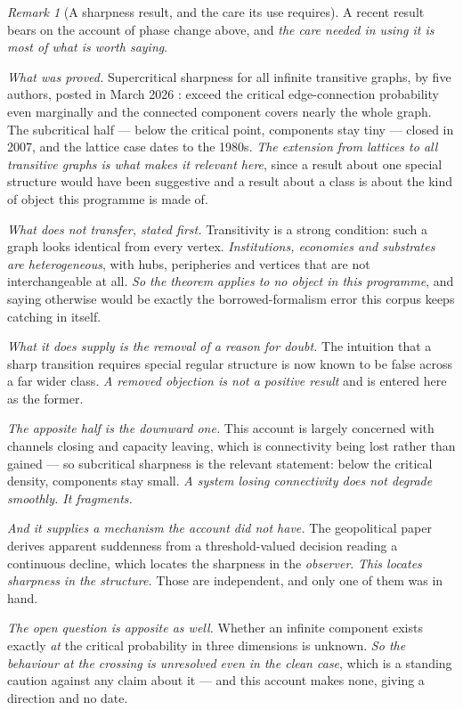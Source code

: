 \documentclass[11pt,a4paper]{article}
\theoremstyle{remark}
\newtheorem{remark}[definition]{Remark}
\begin{document}
\begin{remark}[A sharpness result, and the care its use requires]\label{rem:percolation}
A recent result bears on the account of phase change above, and \emph{the care needed in using it is
most of what is worth saying}.

\emph{What was proved.} Supercritical sharpness for all infinite transitive graphs, by five authors,
posted in March 2026 \citep{percolation2026}: exceed the critical edge-connection probability
even marginally and the connected component covers nearly the whole graph. The subcritical half ---
below the critical point, components stay tiny --- closed in 2007, and the lattice case dates to the
1980s. \emph{The extension from lattices to all transitive graphs is what makes it relevant here}, since
a result about one special structure would have been suggestive and a result about a class is about the
kind of object this programme is made of.

\emph{What does not transfer, stated first.} Transitivity is a strong condition: such a graph looks
identical from every vertex. \emph{Institutions, economies and substrates are heterogeneous}, with hubs,
peripheries and vertices that are not interchangeable at all. \emph{So the theorem applies to no object
in this programme}, and saying otherwise would be exactly the borrowed-formalism error this corpus keeps
catching in itself.

\emph{What it does supply is the removal of a reason for doubt.} The intuition that a sharp transition
requires special regular structure is now known to be false across a far wider class. \emph{A removed
objection is not a positive result} and is entered here as the former.

\emph{The apposite half is the downward one.} This account is largely concerned with channels closing
and capacity leaving, which is connectivity being lost rather than gained --- so subcritical sharpness
is the relevant statement: below the critical density, components stay small. \emph{A system losing
connectivity does not degrade smoothly. It fragments.}

\emph{And it supplies a mechanism the account did not have.} The geopolitical paper derives apparent
suddenness from a threshold-valued decision reading a continuous decline, which locates the sharpness in
the \emph{observer}. \emph{This locates sharpness in the structure.} Those are independent, and only one
of them was in hand.

\emph{The open question is apposite as well.} Whether an infinite component exists exactly \emph{at} the
critical probability in three dimensions is unknown. \emph{So the behaviour at the crossing is
unresolved even in the clean case}, which is a standing caution against any claim about it --- and this
account makes none, giving a direction and no date.
\end{remark}
\end{document}
